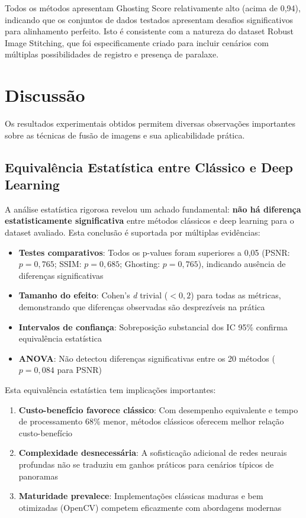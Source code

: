 Todos os métodos apresentam Ghosting Score relativamente alto (acima de 0,94), indicando que os conjuntos de dados testados apresentam desafios significativos para alinhamento perfeito. Isto é consistente com a natureza do dataset Robust Image Stitching, que foi especificamente criado para incluir cenários com múltiplas possibilidades de registro e presença de paralaxe.

\section{Discussão}

Os resultados experimentais obtidos permitem diversas observações importantes sobre as técnicas de fusão de imagens e sua aplicabilidade prática.

\subsection{Equivalência Estatística entre Clássico e Deep Learning}

A análise estatística rigorosa revelou um achado fundamental: \textbf{não há diferença estatisticamente significativa} entre métodos clássicos e deep learning para o dataset avaliado. Esta conclusão é suportada por múltiplas evidências:

\begin{itemize}
    \item \textbf{Testes comparativos}: Todos os p-values foram superiores a 0,05 (PSNR: $p=0{,}765$; SSIM: $p=0{,}685$; Ghosting: $p=0{,}765$), indicando ausência de diferenças significativas
    \item \textbf{Tamanho do efeito}: Cohen's \textit{d} trivial ($<0{,}2$) para todas as métricas, demonstrando que diferenças observadas são desprezíveis na prática
    \item \textbf{Intervalos de confiança}: Sobreposição substancial dos IC 95\% confirma equivalência estatística
    \item \textbf{ANOVA}: Não detectou diferenças significativas entre os 20 métodos ($p=0{,}084$ para PSNR)
\end{itemize}

Esta equivalência estatística tem implicações importantes:

\begin{enumerate}
    \item \textbf{Custo-benefício favorece clássico}: Com desempenho equivalente e tempo de processamento 68\% menor, métodos clássicos oferecem melhor relação custo-benefício
    \item \textbf{Complexidade desnecessária}: A sofisticação adicional de redes neurais profundas não se traduziu em ganhos práticos para cenários típicos de panoramas
    \item \textbf{Maturidade prevalece}: Implementações clássicas maduras e bem otimizadas (OpenCV) competem eficazmente com abordagens modernas
\end{enumerate}

